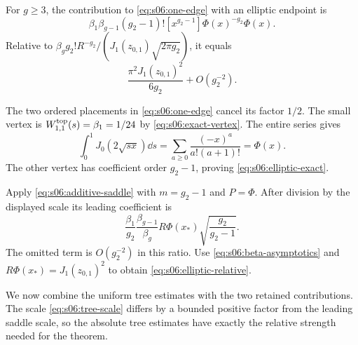 \begin{lmm}\label{lmm:s06:elliptic-leaf}
For $g\geq3$, the contribution to \eqref{eq:s06:one-edge} with
an elliptic endpoint is
\begin{equation}\label{eq:s06:elliptic-exact}
 \beta_1\beta_{g-1}(g_2-1)!
 [x^{g_2-1}]\Phi(x)^{-g_2}\Phi(x).
\end{equation}
Relative to
$\beta_g g_2!R^{-g_2}/(J_1(z_{0,1})\sqrt{2\pi g_2})$,
it equals
\begin{equation}\label{eq:s06:elliptic-relative}
 \frac{\pi^2J_1(z_{0,1})^2}{6g_2}+O(g_2^{-2}).
\end{equation}
\end{lmm}
\begin{prf}
The two ordered placements in \eqref{eq:s06:one-edge} cancel
its factor $1/2$. The small vertex is
$W^{\rm top}_{1,1}(s)=\beta_1=1/24$ by
\eqref{eq:s06:exact-vertex}. The entire series gives
\[
 \int_0^1J_0(2\sqrt{s x})\dd s
    =\sum_{a\geq0}\frac{(-x)^a}{a!(a+1)!}=\Phi(x).
\]
The other vertex has coefficient order $g_2-1$, proving
\eqref{eq:s06:elliptic-exact}.

Apply \eqref{eq:s06:additive-saddle} with $m=g_2-1$ and
$P=\Phi$. After division by the displayed scale its leading
coefficient is
\[
 \frac{\beta_1}{g_2}\frac{\beta_{g-1}}{\beta_g}
     R\Phi(x_*)\sqrt{\frac{g_2}{g_2-1}}.
\]
The omitted term is $O(g_2^{-2})$ in this ratio. Use
\eqref{eq:s06:beta-asymptotics} and
$R\Phi(x_*)=J_1(z_{0,1})^2$ to obtain
\eqref{eq:s06:elliptic-relative}.
\end{prf}

We now combine the uniform tree estimates with the two retained
contributions. The scale \eqref{eq:s06:tree-scale} differs by a
bounded positive factor from the leading saddle scale, so the
absolute tree estimates have exactly the relative strength needed
for the theorem.

